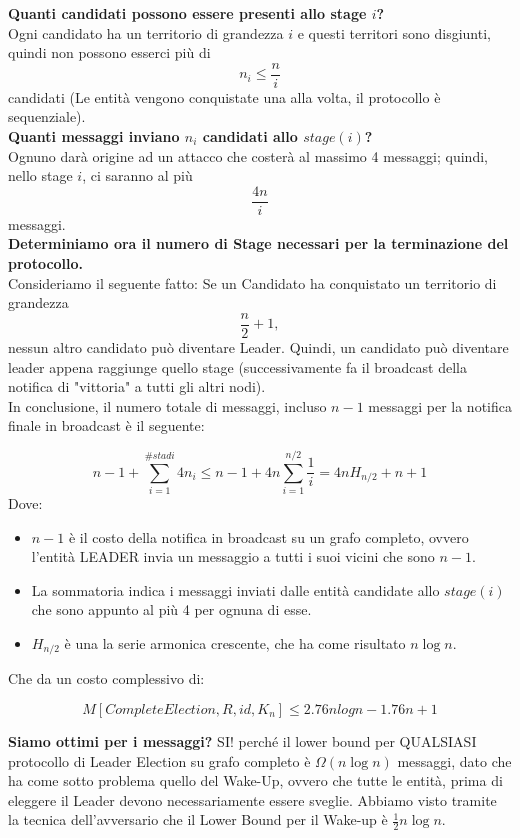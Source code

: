 \textbf{Quanti candidati possono essere presenti allo stage
    $i$?}\\
Ogni candidato ha un territorio di grandezza $i$ e questi territori sono
disgiunti, quindi non possono esserci più di $$n_i \leq \frac{n}{i}$$ candidati
(Le entità vengono conquistate una alla volta, il protocollo è sequenziale). \\

\textbf{Quanti messaggi inviano $n_i$ candidati allo
    $stage(i)$?}\\
Ognuno darà origine ad un attacco che costerà al massimo 4 messaggi; quindi,
nello stage $i$, ci saranno al più $$\frac{4n}{i}$$ messaggi.\\

\textbf{Determiniamo ora il numero di Stage necessari per la
    terminazione del protocollo.} \\
Consideriamo il seguente fatto: Se un Candidato ha conquistato un territorio di
grandezza $$\frac{n}{2} +1,$$ nessun altro candidato può diventare Leader.
Quindi, un candidato può diventare leader appena raggiunge quello stage
(successivamente fa il broadcast della notifica di "vittoria" a tutti gli altri
nodi).\\

In conclusione, il numero totale di messaggi, incluso $n-1$ messaggi per la
notifica finale in broadcast è il seguente:

$$ n-1 + \sum_{i=1}^{\#stadi} 4 n_i \leq n-1 + 4n \sum_{i=1}^{n/2} \frac{1}{i} = 4 n
    H_{n/2} + n + 1$$ Dove:
\begin{itemize}
    \item $n-1$ è il costo della notifica in broadcast su un grafo completo,
          ovvero l'entità LEADER invia un messaggio a tutti i suoi vicini che sono
          $n-1$.
    \item La sommatoria indica i messaggi inviati dalle entità candidate allo
          $stage(i)$ che sono appunto al più 4 per ognuna di esse.
    \item $H_{n/2}$ è una la serie armonica
          crescente, che ha come risultato $n\log n$.

\end{itemize}

Che da un costo complessivo di:

$$M[CompleteElection, R, id, K_n] \leq 2.76 n log n - 1.76 n + 1$$

\textbf{Siamo ottimi per i messaggi?}
SI! perché il lower bound per QUALSIASI protocollo di Leader Election su grafo
completo è $\Omega(n \log n)$ messaggi, dato che ha come sotto problema quello
del Wake-Up, ovvero che tutte le entità, prima di eleggere il Leader devono
necessariamente essere sveglie. Abbiamo visto tramite la tecnica dell'avversario
che il Lower Bound per il Wake-up è $\frac{1}{2}n \log n$.\\


